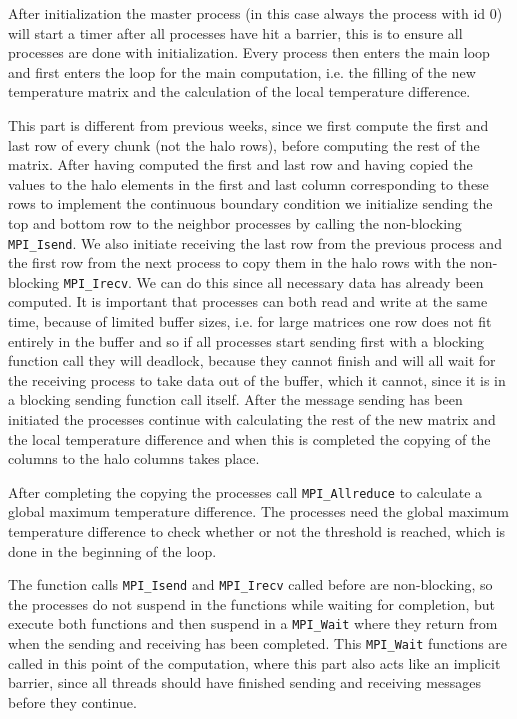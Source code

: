 \documentclass[11pt,a4paper,onecolumn]{article}
\begin{document}
After initialization the master process (in this case always the process with id 0) will start a timer after all processes have hit a barrier, this is to ensure all processes are done with initialization. Every process then enters the main loop and first enters the loop for the main computation, i.e. the filling of the new temperature matrix and the calculation of the local temperature difference.
 
This part is different from previous weeks, since we first compute the first and last row of every chunk (not the halo rows), before computing the rest of the matrix. After having computed the first and last row and having copied the values to the halo elements in the first and last column corresponding to these rows to implement the continuous boundary condition we initialize sending the top and bottom row to the neighbor processes by calling the non-blocking \texttt{MPI\_Isend}. We also initiate receiving the last row from the previous process and the first row from the next process to copy them in the halo rows with the non-blocking  \texttt{MPI\_Irecv}. We can do this since all necessary data has already been computed. It is important that processes can both read and write at the same time, because of limited buffer sizes, i.e. for large matrices one row does not fit entirely in the buffer and so if all processes start sending first with a blocking function call they will deadlock, because they cannot finish and will all wait for the receiving process to take data out of the buffer, which it cannot, since it is in a blocking sending function call itself. After the message sending has been initiated the processes continue with calculating the rest of the new matrix and the local temperature difference and when this is completed the copying of the columns to the halo columns takes place. 

After completing the copying the processes call \texttt{MPI\_Allreduce} to calculate a global maximum temperature difference. The processes need the global maximum temperature difference to check whether or not the threshold is reached, which is done in the beginning of the loop. 

The function calls \texttt{MPI\_Isend} and \texttt{MPI\_Irecv} called before are non-blocking, so the processes do not suspend in the functions while waiting for completion, but execute both functions and then suspend in a \texttt{MPI\_Wait} where they return from when the sending and receiving has been completed. This \texttt{MPI\_Wait} functions are called in this point of the computation, where this part also acts like an implicit barrier, since all threads should have finished sending and receiving messages before they continue.
\end{document}
